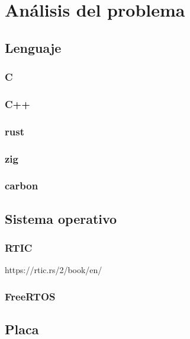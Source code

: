 \chapter{Análisis del problema}

\section{Lenguaje}
\subsection{C}
\subsection{C++}
\subsection{rust}
\subsection{zig}
\subsection{carbon}

\section{Sistema operativo}
\subsection{RTIC}
https://rtic.rs/2/book/en/
\subsection{FreeRTOS}

\section{Placa}

 
